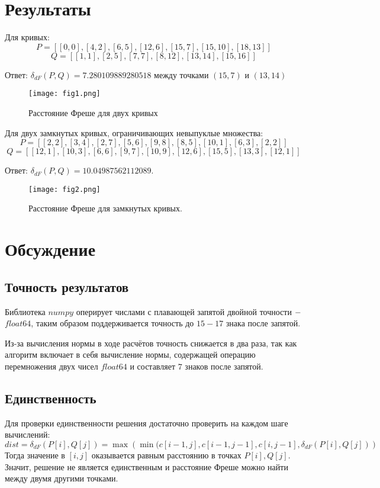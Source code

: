 \documentclass[a4]{article}
\begin{document}
\newpage
\section{Результаты}

Для кривых:
$$P = [[0, 0], [4, 2], [6, 5], [12, 6], [15, 7], [15, 10], [18, 13]]$$
$$Q = [[1, 1], [2, 5], [7, 7], [8, 12], [13, 14], [15, 16]]$$

Ответ: $\delta_{dF}(P,Q) = 7.280109889280518$ между точками $(15,7)$ и $(13,14)$

\begin{figure}[H]
\caption{Расстояние Фреше для двух кривых }
\texttt{[image: fig1.png]} 
\end{figure}
\newpage

Для двух замкнутых кривых, ограничивающих невыпуклые множества:
$$P = [[2, 2], [3, 4], [2, 7], [5, 6], [9, 8], [8, 5], [10, 1], [6, 3], [2, 2]]$$
$$Q = [[12, 1], [10, 3], [6, 6], [9, 7], [10, 9], [12, 6], [15, 5], [13, 3], [12, 1]]$$

Ответ: $\delta_{dF}(P,Q) = 10.04987562112089$.

\begin{figure}[H]
\caption{Расстояние Фреше для замкнутых кривых. }
\texttt{[image: fig2.png]} 
\end{figure}

\section{Обсуждение}
\subsection{Точность результатов}
Библиотека $numpy$ оперирует числами с плавающей запятой двойной точности $\--$ $float64$, таким образом поддерживается точность до $15-17$ знака после запятой.

Из-за вычисления нормы в ходе расчётов точность снижается в два раза, так как алгоритм включает в себя вычисление нормы, содержащей операцию перемножения двух чисел $float64$ и составляет $7$ знаков после запятой.

\subsection{Единственность}
Для проверки единственности решения достаточно проверить на каждом шаге вычислений: \begin{equation}
dist = \delta_{dF}(P[i],Q[j]) = \max\left(\min(c[i-1,j], c[i-1,j-1],c[i,j-1]  ,\delta_{dF}(P[i],Q[j])\right)
\end{equation}
Тогда значение в $[i,j]$ оказывается равным расстоянию в точках $P[i], Q[j].$ Значит, решение не является единственным и расстояние Фреше можно найти между двумя другими точками.
\end{document}

